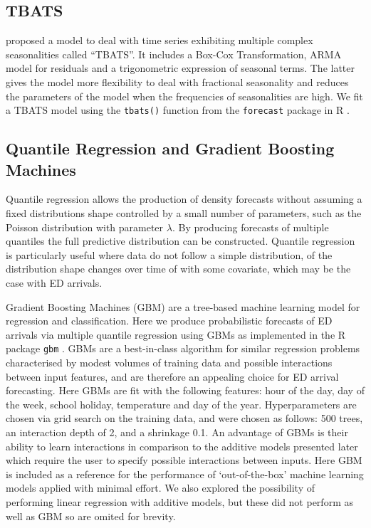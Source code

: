 \documentclass[]{elsarticle} %
\begin{document}
\hypertarget{tbats}{%
\subsection{TBATS}\label{tbats}}

\citet{de2011forecasting} proposed a model to deal with time series exhibiting multiple complex seasonalities called ``TBATS''. It includes a Box-Cox Transformation, ARMA model for residuals and a trigonometric expression of seasonal terms. The latter gives the model more flexibility to deal with fractional seasonality and reduces the parameters of the model when the frequencies of seasonalities are high. We fit a TBATS model using the \texttt{tbats()} function from the \texttt{forecast} package in R \citep{forecastpackage2020}.

\hypertarget{quantile-regression-and-gradient-boosting-machines}{%
\subsection{Quantile Regression and Gradient Boosting Machines}\label{quantile-regression-and-gradient-boosting-machines}}

Quantile regression allows the production of density forecasts without assuming a fixed distributions shape controlled by a small number of parameters, such as the Poisson distribution with parameter \(\lambda\). By producing forecasts of multiple quantiles the full predictive distribution can be constructed. Quantile regression is particularly useful where data do not follow a simple distribution, of the distribution shape changes over time of with some covariate, which may be the case with ED arrivals.

Gradient Boosting Machines (GBM) are a tree-based machine learning model for regression and classification. Here we produce probabilistic forecasts of ED arrivals via multiple quantile regression using GBMs as implemented in the R package \texttt{gbm} \citep{Greenwell2020}. GBMs are a best-in-class algorithm for similar regression problems characterised by modest volumes of training data and possible interactions between input features, and are therefore an appealing choice for ED arrival forecasting. Here GBMs are fit with the following features: hour of the day, day of the week, school holiday, temperature and day of the year. Hyperparameters are chosen via grid search on the training data, and were chosen as follows: 500 trees, an interaction depth of 2, and a shrinkage 0.1. An advantage of GBMs is their ability to learn interactions in comparison to the additive models presented later which require the user to specify possible interactions between inputs. Here GBM is included as a reference for the performance of `out-of-the-box' machine learning models applied with minimal effort. We also explored the possibility of performing linear regression with additive models, but these did not perform as well as GBM so are omited for brevity.
\end{document}
